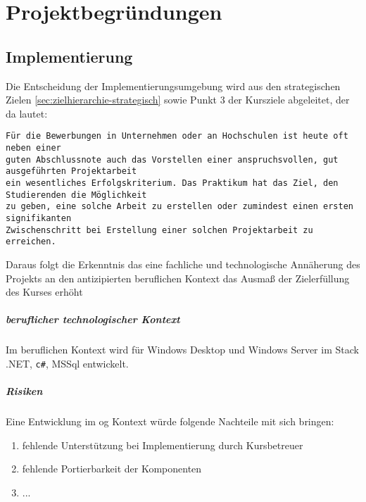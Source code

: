 \chapter{Projektbegründungen}

\begin{comment}
Die Projektbegründungen sind jene Begründungen, die Bezug nehmen auf jegliche Entscheidungen, die im Projekt getroffen werden. Es sind somit projektspezifische Begründungen. Darin sollten Alternativen abgewägt werden und Inhalte auf den Punkt gebracht werden, sodass "Totes Wissen" eliminiert wird. Ein roter Faden sollte ersichtlich sein. Als Referenz dienen jeweilige Artefakte, die in dem Projekt entwickelt worden sind und demnach begründet werden müssen. 
\end{comment}


\section{Implementierung}
Die Entscheidung der Implementierungsumgebung wird aus den strategischen Zielen \ref{sec:zielhierarchie-strategisch}
sowie Punkt 3 der Kursziele abgeleitet, der da lautet:
\begin{verbatim}
Für die Bewerbungen in Unternehmen oder an Hochschulen ist heute oft neben einer 
guten Abschlussnote auch das Vorstellen einer anspruchsvollen, gut ausgeführten Projektarbeit 
ein wesentliches Erfolgskriterium. Das Praktikum hat das Ziel, den Studierenden die Möglichkeit 
zu geben, eine solche Arbeit zu erstellen oder zumindest einen ersten signifikanten 
Zwischenschritt bei Erstellung einer solchen Projektarbeit zu erreichen.
\end{verbatim}
\noindent

Daraus folgt die Erkenntnis das eine fachliche und technologische Annäherung des Projekts an den antizipierten beruflichen Kontext das Ausmaß der Zielerfüllung des Kurses erhöht

\paragraph{beruflicher technologischer Kontext}

Im beruflichen Kontext wird für Windows Desktop und Windows Server im Stack .NET, \verb+c#+, MSSql entwickelt.

\paragraph{Risiken}
Eine Entwicklung im og Kontext würde folgende Nachteile mit sich bringen:
\begin{enumerate}
\item fehlende Unterstützung bei Implementierung durch Kursbetreuer
\item fehlende Portierbarkeit der Komponenten
\item ...
\end{enumerate}
\noindent

